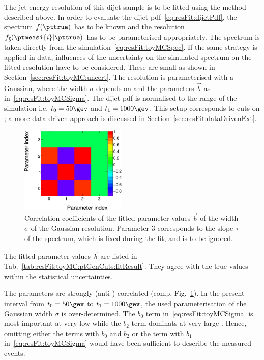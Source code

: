 \documentclass[a4paper]{cmspaper} %
\begin{document}
The jet energy resolution of this dijet sample is to be fitted using the method described above.
In order to evaluate the dijet pdf~\eqref{eq:resFit:dijetPdf}, the spectrum $f(\pttrue)$ has to be known and the resolution $f_{\vec{b}}(\ptmeasi{i}|\pttrue)$ has to be parameterised appropriately.
The spectrum is taken directly from the simulation~\eqref{eq:resFit:toyMCSpec}.
If the same strategy is applied in data, influences of the uncertainty on the simulated spectrum on the fitted resolution have to be considered.
These are small as shown in Section~\ref{sec:resFit:toyMC:uncert}.
The resolution is parameterised with a Gaussian, where the width $\sigma$ depends on \pttrue and the parameters $\vec{b}$ as in~\eqref{eq:resFit:toyMCSigma}.
The dijet pdf is normalised to the \pttrue range of the simulation i.e. $t_{0} = 50\gev$ and $t_{1} = 1000\gev$.
This setup corresponds to cuts on \pttrue; a more data driven approach is discussed in Section~\ref{sec:resFit:dataDrivenExt}.

\begin{figure}[ht]
  \centering
  \includegraphics[width=0.45\textwidth]{figures/resFit_ToyMC_PtGenCuts_Correlations}
  \caption{Correlation coefficients of the fitted parameter values
    $\vec{b}$ of the width $\sigma$ of the Gaussian
    resolution. Parameter $3$ corresponds to the slope $\tau$ of the
    spectrum, which is fixed during the fit, and is to be ignored.}
  \label{fig:resFit:toyMC:ptGenCuts:parCorr}
\end{figure}

The fitted parameter values $\vec{b}$ are listed in Tab.~\ref{tab:resFit:toyMC:ptGenCuts:fitResult}.
They agree with the true values within the statistical uncertainties.

The parameters are strongly (anti-) correlated (comp. Fig.~\ref{fig:resFit:toyMC:ptGenCuts:parCorr}).
In the present \pttrue interval from \mbox{$t_{0} = 50\gev$} to \mbox{$t_{1} = 1000\gev$}, the used parameterisation of the Gaussian width $\sigma$ is over-determined.
The $b_{0}$ term in~\eqref{eq:resFit:toyMCSigma} is most important at very low \pt while the $b_{2}$ term dominats at very large \pt.
Hence, omitting either the terms with $b_{0}$ and $b_{2}$ or the term with $b_{1}$ in~\eqref{eq:resFit:toyMCSigma} would have been sufficient to describe the measured events.
\end{document}
